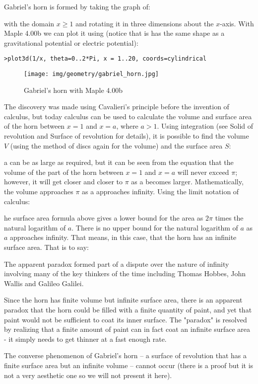 {	Gabriel's horn is formed by taking the graph of:
	
	with the domain $x\geq 1$ and rotating it in three dimensions about the $x$-axis. With Maple 4.00b we can plot it using (notice that is has the same shape as a gravitational potential or electric potential):
	
	\texttt{>plot3d(1/x, theta=0..2*Pi, x = 1..20, coords=cylindrical}
	\begin{figure}[H]
		\centering
		\texttt{[image: img/geometry/gabriel\_horn.jpg]}
		\caption{Gabriel's horn with Maple 4.00b}
	\end{figure}  	
	The discovery was made using Cavalieri's principle before the invention of calculus, but today calculus can be used to calculate the volume and surface area of the horn between $x = 1$ and $x = a$, where $a > 1$. Using integration (see Solid of revolution and Surface of revolution for details), it is possible to find the volume $V$ (using the method of discs again for the volume) and the surface area $S$:
	
	a can be as large as required, but it can be seen from the equation that the volume of the part of the horn between $x = 1$ and $x = a$ will never exceed $\pi$; however, it will get closer and closer to $\pi$ as a becomes larger. Mathematically, the volume approaches $\pi$ as a approaches infinity. Using the limit notation of calculus:
	
	he surface area formula above gives a lower bound for the area as $2\pi$ times the natural logarithm of $a$. There is no upper bound for the natural logarithm of $a$ as $a$ approaches infinity. That means, in this case, that the horn has an infinite surface area. That is to say:
	
	The apparent paradox formed part of a dispute over the nature of infinity involving many of the key thinkers of the time including Thomas Hobbes, John Wallis and Galileo Galilei.
	
	\begin{tcolorbox}[title=Remark,colframe=black,arc=10pt]
	Since the horn has finite volume but infinite surface area, there is an apparent paradox that the horn could be filled with a finite quantity of paint, and yet that paint would not be sufficient to coat its inner surface. The "paradox" is resolved by realizing that a finite amount of paint can in fact coat an infinite surface area - it simply needs to get thinner at a fast enough rate. 
	\end{tcolorbox}
	The converse phenomenon of Gabriel's horn – a surface of revolution that has a finite surface area but an infinite volume – cannot occur (there is a proof but it is not a very aesthetic one so we will not present it here).
	
}
